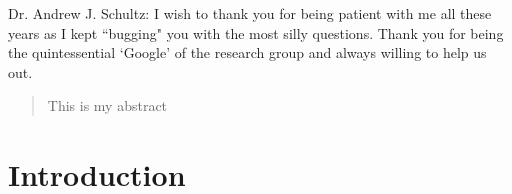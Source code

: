 \documentclass[a4paper,11pt,english,twoside]{ubthesis}
\begin{document}
\begin{ubfrontmatter}
\begin{acknowledgements}
    \noindent Dr. Andrew J. Schultz: I wish to thank you for being patient with me all these years as I kept ``bugging" you with the most silly questions. Thank you for being the quintessential `Google' of the research group and always willing to help us out. 
\end{acknowledgements}
\tableofcontents
\cleardoublepage
\listoffigures
\cleardoublepage
\listoftables
\cleardoublepage
\begin{abstract}
This is my abstract
\end{abstract}
\end{ubfrontmatter}

\chapter{Introduction}

\begin{ubbackmatter}
\end{ubbackmatter}
\end{document}
